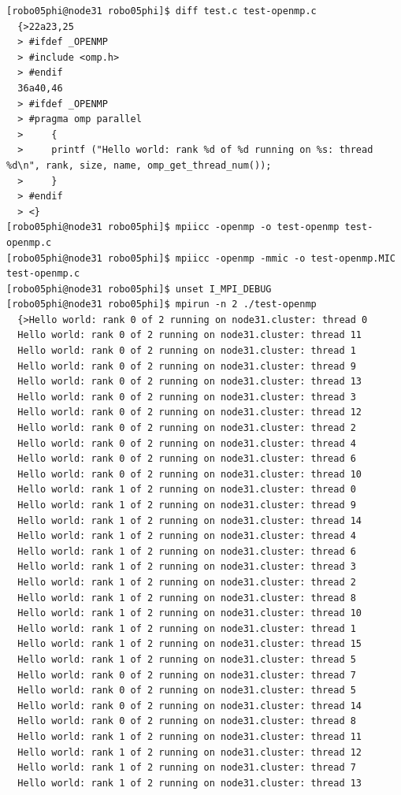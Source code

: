 \documentclass[pscyr,10pt]{hedlab}
\begin{document}
\begin{lstlisting}
[robo05phi@node31 robo05phi]$ diff test.c test-openmp.c
  {>22a23,25
  > #ifdef _OPENMP
  > #include <omp.h>
  > #endif
  36a40,46
  > #ifdef _OPENMP
  > #pragma omp parallel
  >     {
  > 	printf ("Hello world: rank %d of %d running on %s: thread %d\n", rank, size, name, omp_get_thread_num());
  >     }
  > #endif
  > <}
[robo05phi@node31 robo05phi]$ mpiicc -openmp -o test-openmp test-openmp.c
[robo05phi@node31 robo05phi]$ mpiicc -openmp -mmic -o test-openmp.MIC test-openmp.c
[robo05phi@node31 robo05phi]$ unset I_MPI_DEBUG
[robo05phi@node31 robo05phi]$ mpirun -n 2 ./test-openmp
  {>Hello world: rank 0 of 2 running on node31.cluster: thread 0
  Hello world: rank 0 of 2 running on node31.cluster: thread 11
  Hello world: rank 0 of 2 running on node31.cluster: thread 1
  Hello world: rank 0 of 2 running on node31.cluster: thread 9
  Hello world: rank 0 of 2 running on node31.cluster: thread 13
  Hello world: rank 0 of 2 running on node31.cluster: thread 3
  Hello world: rank 0 of 2 running on node31.cluster: thread 12
  Hello world: rank 0 of 2 running on node31.cluster: thread 2
  Hello world: rank 0 of 2 running on node31.cluster: thread 4
  Hello world: rank 0 of 2 running on node31.cluster: thread 6
  Hello world: rank 0 of 2 running on node31.cluster: thread 10
  Hello world: rank 1 of 2 running on node31.cluster: thread 0
  Hello world: rank 1 of 2 running on node31.cluster: thread 9
  Hello world: rank 1 of 2 running on node31.cluster: thread 14
  Hello world: rank 1 of 2 running on node31.cluster: thread 4
  Hello world: rank 1 of 2 running on node31.cluster: thread 6
  Hello world: rank 1 of 2 running on node31.cluster: thread 3
  Hello world: rank 1 of 2 running on node31.cluster: thread 2
  Hello world: rank 1 of 2 running on node31.cluster: thread 8
  Hello world: rank 1 of 2 running on node31.cluster: thread 10
  Hello world: rank 1 of 2 running on node31.cluster: thread 1
  Hello world: rank 1 of 2 running on node31.cluster: thread 15
  Hello world: rank 1 of 2 running on node31.cluster: thread 5
  Hello world: rank 0 of 2 running on node31.cluster: thread 7
  Hello world: rank 0 of 2 running on node31.cluster: thread 5
  Hello world: rank 0 of 2 running on node31.cluster: thread 14
  Hello world: rank 0 of 2 running on node31.cluster: thread 8
  Hello world: rank 1 of 2 running on node31.cluster: thread 11
  Hello world: rank 1 of 2 running on node31.cluster: thread 12
  Hello world: rank 1 of 2 running on node31.cluster: thread 7
  Hello world: rank 1 of 2 running on node31.cluster: thread 13

\end{lstlisting}
\end{document}
